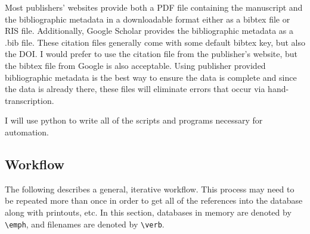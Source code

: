 \documentclass[letterpaper,12pt]{article}
\begin{document}
Most publishers' websites provide both a PDF file containing the manuscript and the bibliographic metadata in a downloadable format either as a bibtex file or RIS file. Additionally, Google Scholar provides the bibliographic metadata as a .bib file. These citation files generally come with some default bibtex key, but also the DOI. I would prefer to use the citation file from the publisher's website, but the bibtex file from Google is also acceptable. Using publisher provided bibliographic metadata is the best way to ensure the data is complete and since the data is already there, these files will eliminate errors that occur via hand-transcription.

I will use python to write all of the scripts and programs necessary for automation.



\subsection{Workflow}
The following describes a general, iterative workflow. This process may need to be repeated more than once in order to get all of the references into the database along with printouts, etc. In this section, databases in memory are denoted by \verb|\emph|, and filenames are denoted by \verb|\verb|.
\end{document}
